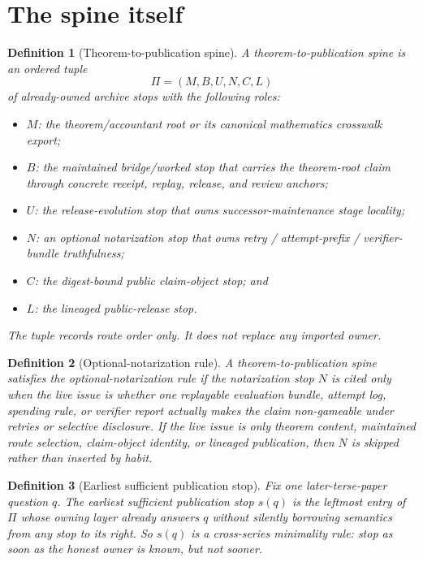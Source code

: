 \documentclass[11pt]{article}
\newtheorem{definition}{Definition}
\begin{document}
\section{The spine itself}

\begin{definition}[Theorem-to-publication spine]
A \emph{theorem-to-publication spine} is an ordered tuple
\[
\Pi=(M,B,U,N,C,L)
\]
of already-owned archive stops with the following roles:
\begin{itemize}[leftmargin=*]
\item $M$: the theorem/accountant root or its canonical mathematics crosswalk export;
\item $B$: the maintained bridge/worked stop that carries the theorem-root claim through concrete receipt, replay, release, and review anchors;
\item $U$: the release-evolution stop that owns successor-maintenance stage locality;
\item $N$: an optional notarization stop that owns retry / attempt-prefix / verifier-bundle truthfulness;
\item $C$: the digest-bound public claim-object stop; and
\item $L$: the lineaged public-release stop.
\end{itemize}
The tuple records route order only.
It does not replace any imported owner.
\end{definition}

\begin{definition}[Optional-notarization rule]
A theorem-to-publication spine satisfies the \emph{optional-notarization rule} if the notarization stop $N$ is cited only when the live issue is whether one replayable evaluation bundle, attempt log, spending rule, or verifier report actually makes the claim non-gameable under retries or selective disclosure.
If the live issue is only theorem content, maintained route selection, claim-object identity, or lineaged publication, then $N$ is skipped rather than inserted by habit.
\end{definition}

\begin{definition}[Earliest sufficient publication stop]
Fix one later-terse-paper question $q$.
The \emph{earliest sufficient publication stop} $s(q)$ is the leftmost entry of $\Pi$ whose owning layer already answers $q$ without silently borrowing semantics from any stop to its right.
So $s(q)$ is a cross-series minimality rule: stop as soon as the honest owner is known, but not sooner.
\end{definition}
\end{document}
